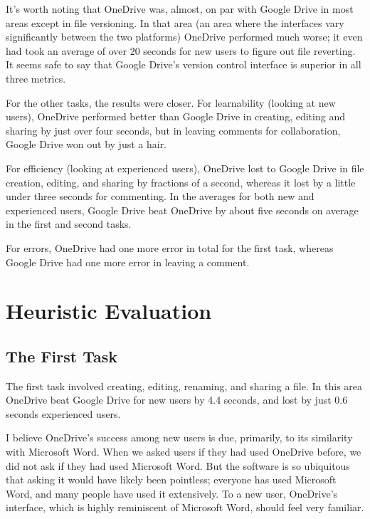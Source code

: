 \documentclass[a4paper,12pt]{article}
\begin{document}
It's worth noting that OneDrive was, almost, on par with Google Drive in most areas except in file versioning. In that area (an area where the interfaces vary significantly between the two platforms) OneDrive performed much worse; it even had took an average of over 20 seconds for new users to figure out file reverting. It seems safe to say that Google Drive's version control interface is superior in all three metrics. 

For the other tasks, the results were closer. For learnability (looking at new users), OneDrive performed better than Google Drive in creating, editing and sharing by just over four seconds, but in leaving comments for collaboration, Google Drive won out by just a hair. 

For efficiency (looking at experienced users), OneDrive lost to Google Drive in file creation, editing, and sharing by fractions of a second, whereas it lost by a little under three seconds for commenting. In the averages for both new and experienced users, Google Drive beat OneDrive by about five seconds on average in the first and second tasks.

For errors, OneDrive had one more error in total for the first task, whereas Google Drive had one more error in leaving a comment.

\section{Heuristic Evaluation}

\subsection{The First Task}

The first task involved creating, editing, renaming, and sharing a file. In this area OneDrive beat Google Drive for new users by 4.4 seconds, and lost by just 0.6 seconds experienced users. 

I believe OneDrive's success among new users is due, primarily, to its similarity with Microsoft Word. When we asked users if they had used OneDrive before, we did not ask if they had used Microsoft Word. But the software is so ubiquitous that asking it would have likely been pointless; everyone has used Microsoft Word, and many people have used it extensively. To a new user, OneDrive's interface, which is highly reminiscent of Microsoft Word, should feel very familiar.
\end{document}
